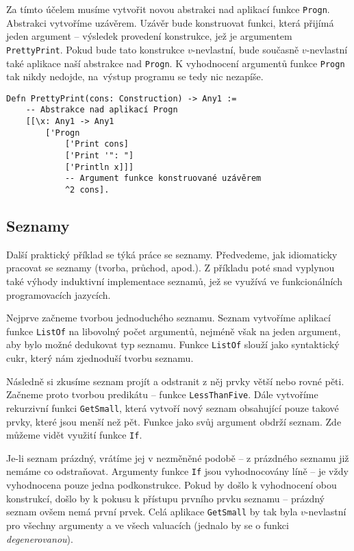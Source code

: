 Za tímto účelem musíme vytvořit novou abstrakci nad aplikací funkce \lstinline{Progn}. Abstrakci
vytvoříme uzávěrem. Uzávěr bude konstruovat funkci, která přijímá jeden argument -- výsledek
provedení konstrukce, jež je argumentem \lstinline{PrettyPrint}. Pokud bude tato konstrukce
$v$-nevlastní, bude současně $v$-nevlastní také aplikace naší abstrakce nad \lstinline{Progn}.
K vyhodnocení argumentů funkce \lstinline{Progn} tak nikdy nedojde, na~výstup programu se tedy nic
nezapíše.

\begin{lstlisting}[caption={Funkce a uzávěry}]
Defn PrettyPrint(cons: Construction) -> Any1 :=
    -- Abstrakce nad aplikací Progn
    [[\x: Any1 -> Any1
        ['Progn
            ['Print cons]
            ['Print '": "]
            ['Println x]]]
            -- Argument funkce konstruované uzávěrem
            ^2 cons].
\end{lstlisting}

\subsection{Seznamy}

Další praktický příklad se týká práce se seznamy. Předvedeme, jak idiomaticky pracovat se seznamy
(tvorba, průchod, apod.). Z příkladu poté snad vyplynou také výhody induktivní implementace
seznamů, jež se využívá ve funkcionálních programovacích jazycích.

Nejprve začneme tvorbou jednoduchého seznamu. Seznam vytvoříme aplikací funkce \lstinline{ListOf}
na libovolný počet argumentů, nejméně však na jeden argument, aby bylo možné dedukovat typ seznamu.
Funkce \lstinline{ListOf} slouží jako syntaktický cukr, který nám zjednoduší tvorbu seznamu.

Následně si zkusíme seznam projít a odstranit z něj prvky větší nebo rovné pěti. Začneme proto
tvorbou predikátu -- funkce \lstinline{LessThanFive}. Dále vytvoříme rekurzivní funkci
\lstinline{GetSmall}, která vytvoří nový seznam obsahující pouze takové prvky, které jsou menší než
pět. Funkce jako svůj argument obdrží seznam. Zde můžeme vidět využití funkce \lstinline{If}.

Je-li seznam prázdný, vrátíme jej v nezměněné podobě -- z prázdného seznamu již nemáme co
odstraňovat. Argumenty funkce \lstinline{If} jsou vyhodnocovány líně -- je vždy vyhodnocena pouze
jedna podkonstrukce. Pokud by došlo k vyhodnocení obou konstrukcí, došlo by k pokusu k přístupu
prvního prvku seznamu -- prázdný seznam ovšem nemá první prvek. Celá aplikace \lstinline{GetSmall}
by tak byla $v$-nevlastní pro všechny argumenty a ve všech valuacích (jednalo by se o funkci
\textit{degenerovanou}).

